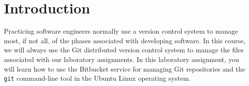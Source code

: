 

\usepackage[compact]{titlesec}



\section*{Introduction}

Practicing software engineers normally use a version control system to manage most, if not all, of the phases associated
with developing software.  In this course, we will always use the Git distributed version control system to manage the
files associated with our laboratory assignments.  In this laboratory assignment, you will learn how to use the
Bitbucket service for managing Git repositories and the {\tt git} command-line tool in the Ubuntu Linux operating system.


